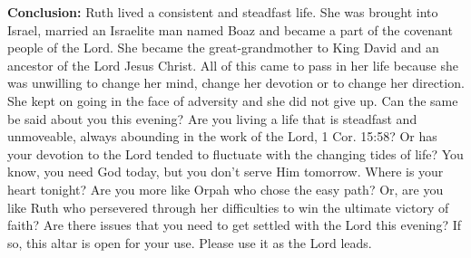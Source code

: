 \textbf{Conclusion: }Ruth lived a consistent and steadfast life. She was brought into Israel, married an Israelite man named Boaz and became a part of the covenant people of the Lord. She became the great-grandmother to King David and an ancestor of the Lord Jesus Christ. All of this came to pass in her life because she was unwilling to change her mind, change her devotion or to change her direction. She kept on going in the face of adversity and she did not give up. Can the same be said about you this evening? Are you living a life that is steadfast and unmoveable, always abounding in the work of the Lord, 1 Cor. 15:58? Or has your devotion to the Lord tended to fluctuate with the changing tides of life? You know, you need God today, but you don't serve Him tomorrow. Where is your heart tonight? Are you more like Orpah who chose the easy path? Or, are you like Ruth who persevered through her difficulties to win the ultimate victory of faith? Are there issues that you need to get settled with the Lord this evening? If so, this altar is open for your use. Please use it as the Lord leads.

